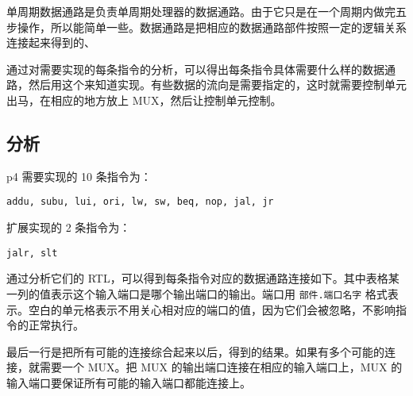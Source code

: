 \documentclass[12pt,AutoFakeBold]{article}
\begin{document}
单周期数据通路是负责单周期处理器的数据通路。由于它只是在一个周期内做完五步操作，所以能简单一些。数据通路是把相应的数据通路部件按照一定的逻辑关系连接起来得到的、

通过对需要实现的每条指令的分析，可以得出每条指令具体需要什么样的数据通路，然后用这个来知道实现。有些数据的流向是需要指定的，这时就需要控制单元出马，在相应的地方放上
MUX，然后让控制单元控制。

\hypertarget{ux5206ux6790}{%
\subsection{分析}\label{ux5206ux6790}}

p4 需要实现的 10 条指令为：

\texttt{addu,\ subu,\ lui,\ ori,\ lw,\ sw,\ beq,\ nop,\ jal,\ jr}

扩展实现的 2 条指令为：

\texttt{jalr,\ slt}

通过分析它们的
RTL，可以得到每条指令对应的数据通路连接如下。其中表格某一列的值表示这个输入端口是哪个输出端口的输出。端口用
\texttt{部件.端口名字}
格式表示。空白的单元格表示不用关心相对应的端口的值，因为它们会被忽略，不影响指令的正常执行。

最后一行是把所有可能的连接综合起来以后，得到的结果。如果有多个可能的连接，就需要一个
MUX。把 MUX 的输出端口连接在相应的输入端口上，MUX
的输入端口要保证所有可能的输入端口都能连接上。
\end{document}
